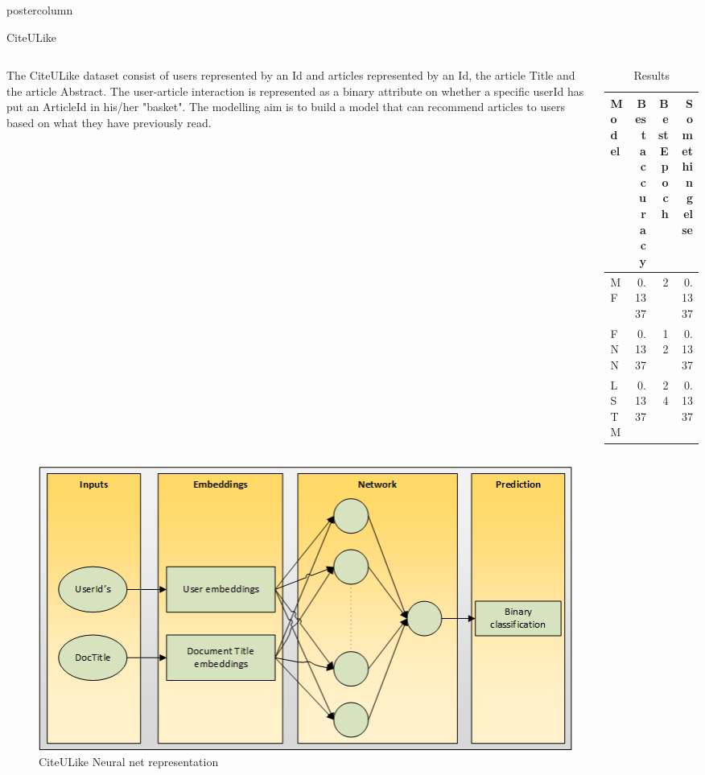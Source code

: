 \documentclass[final,hyperref={pdfpagelabels=false}]{beamer}
\begin{document}
\begin{frame}
\begin{columns}
\begin{column}{.49\paperwidth}
\begin{beamercolorbox}[center,wd=\textwidth]{postercolumn}
\begin{minipage}[T]{.99\textwidth}
{\begin{block}{CiteULike}
\begin{columns}
\begin{column}{1\textwidth}
\centering
\begin{minipage}[t]{0.96\textwidth}
			

\hspace{0.5cm} 
\vspace{-1cm}
\begin{columns}
 \begin{column}{0.45\textwidth}
 \justifying
 \footnotesize{
	The CiteULike dataset consist of users represented by an Id and articles represented by an Id, the article Title and the article Abstract. The user-article interaction is represented as a binary attribute on whether a specific userId has put an ArticleId in his/her "basket". The modelling aim is to build a model that can recommend articles to users based on what they have previously read. }
 \end{column}
 \begin{column}{0.49\textwidth}

\begin{table}[h]
\small
\centering
\caption{Results} 
\label{res:CuL_results}
\begin{tabular}{lrrr}
\toprule
Model  & Best accuracy        & Best Epoch     & Something else    \\
\midrule
MF  	&  0.1337        & 2       & 0.1337    \\
FNN	  &  0.1337        & 12      & 0.1337    \\
LSTM	&  0.1337        & 24      & 0.1337    \\
\bottomrule
\end{tabular}
\end{table}

 \end{column}
 \end{columns}
 
 \begin{figure}

\includegraphics[width=0.85\textwidth]{CiteuLikeNet.png}
 \caption{CiteULike Neural net representation}
\end{figure}  


\end{minipage}
\end{column}
\end{columns}
\end{block}}
\end{minipage}
\end{beamercolorbox}
\end{column}
\end{columns}
\end{frame}
\end{document}
